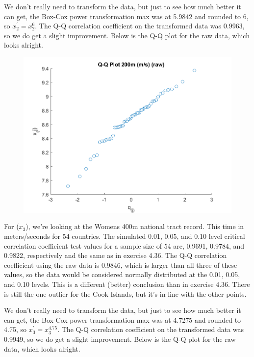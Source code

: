 We don't really need to transform the data, but just to see how much better it can get, the Box-Cox power transformation max was at 5.9842 and rounded to 6, so $x_{2}^{\prime} = x_{2}^{6}$. The Q-Q correlation coefficient on the transformed data was 0.9963, so we do get a slight improvement. Below is the Q-Q plot for the raw data, which looks alright.

\begin{center}
    \begin{figure}[H]
        \centering
        \includegraphics[scale=0.6]{./matlab/chapter-4/sol4.37.qq.2.png}
    \end{figure}
\end{center}

For ($x_{3}$), we're looking at the Womens 400m national tract record. This time in meters/seconds for 54 countries. The simulated 0.01, 0.05, and 0.10 level critical correlation coefficient test values for a sample size of 54 are, 0.9691, 0.9784, and 0.9822, respectively and the same as in exercise 4.36. The Q-Q correlation coefficient using the raw data is 0.9846, which is larger than all three of these values, so the data would be considered normally distributed at the 0.01, 0.05, and 0.10 levels. This is a different (better) conclusion than in exercise 4.36. There is still the one outlier for the Cook Islands, but it's in-line with the other points.

We don't really need to transform the data, but just to see how much better it can get, the Box-Cox power transformation max was at 4.7275 and rounded to 4.75, so $x_{3}^{\prime} = x_{3}^{4.75}$. The Q-Q correlation coefficient on the transformed data was 0.9949, so we do get a slight improvement. Below is the Q-Q plot for the raw data, which looks alright.

